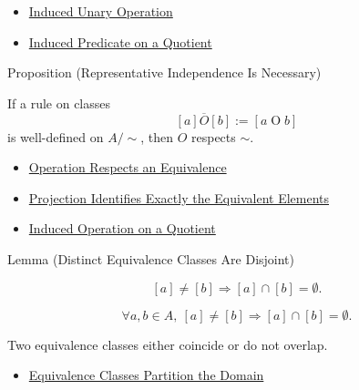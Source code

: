 \begin{dependencies}
\begin{itemize}
  \item \hyperref[thm:induced-unary-operation-on-quotient]{Induced Unary Operation}
  \item \hyperref[thm:induced-predicate-on-quotient]{Induced Predicate on a Quotient}
\end{itemize}
\end{dependencies}

\begin{propositionbox}{Proposition (Representative Independence Is Necessary)}
\begin{proposition}
\label{prop:representative-independence-is-necessary}
If a rule on classes
\[
[a]\mathbin{\overline{O}}[b]:=[a\mathbin{O}b]
\]
is well-defined on $A/{\sim}$, then $O$ respects $\sim$.
\end{proposition}
\end{propositionbox}

\begin{dependencies}
\begin{itemize}
  \item \hyperref[def:operation-respects-equivalence]{Operation Respects an Equivalence}
  \item \hyperref[prop:projection-identifies-equivalent-elements]{Projection Identifies Exactly the Equivalent Elements}
  \item \hyperref[thm:induced-operation-on-quotient]{Induced Operation on a Quotient}
\end{itemize}
\end{dependencies}

\begin{lemmabox}{Lemma (Distinct Equivalence Classes Are Disjoint)}
\begin{lemma}
\label{lem:distinct-equivalence-classes-are-disjoint}
\[
[a]\ne[b] \Longrightarrow [a]\cap[b]=\emptyset.
\]
\end{lemma}
\end{lemmabox}

\begin{remark*}
\[
\forall a,b\in A,\ [a]\ne[b] \Longrightarrow [a]\cap[b]=\emptyset.
\]
\end{remark*}

\begin{remark*}[Interpretation]
Two equivalence classes either coincide or do not overlap.
\end{remark*}

\begin{dependencies}
\begin{itemize}
  \item \hyperref[thm:equivalence-classes-partition-domain]{Equivalence Classes Partition the Domain}
\end{itemize}
\end{dependencies}
